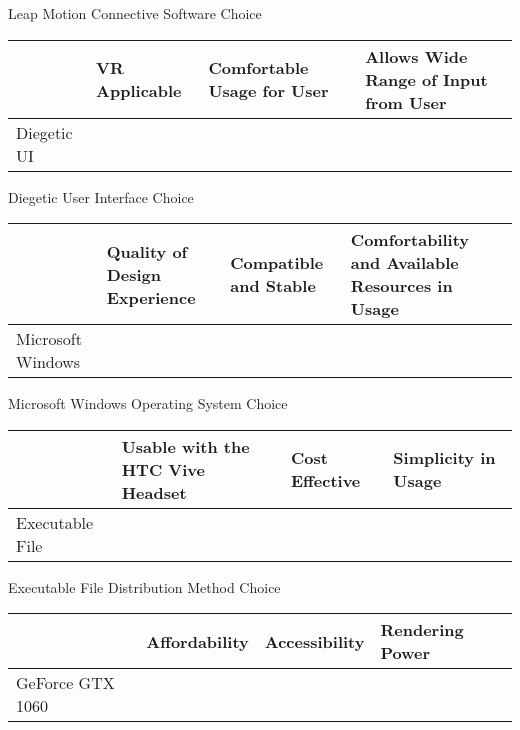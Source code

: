 \documentclass[letterpaper,10pt,onecolumn,compsoc]{IEEEtran}
\begin{document}
\begin{center}
Leap Motion Connective Software Choice
\end{center}

\begin{center}
\begin{tabular}{ | P{2.75cm} | P{2.25cm} | P{4.5cm} | P{6.25cm} | } 
 	\hline
 	 & VR Applicable & Comfortable Usage for User & Allows Wide Range of Input from User \\ 
 	\hline 		
 	Diegetic UI & \checkmark & \checkmark & \checkmark \\ 
 	\hline
\end{tabular}
\end{center}

\begin{center}
Diegetic User Interface Choice
\end{center}

\begin{center}
\begin{tabular}{ | P{3.25cm} | P{4.5cm} | P{3.5cm} | P{4.5cm} | } 
 	\hline
 	 &  Quality of Design Experience & Compatible and Stable & Comfortability and Available Resources in Usage \\ 
 	\hline 		
 	Microsoft Windows &  & \checkmark & \checkmark \\ 
 	\hline
\end{tabular}
\end{center}

\begin{center}
Microsoft Windows Operating System Choice
\end{center}

\begin{center}
\begin{tabular}{ |  P{3.625cm} | P{6cm} | P{2.5cm} | P{3.625cm} | } 
 	\hline
 	 & Usable with the HTC Vive Headset & Cost Effective & Simplicity in Usage \\ 
 	\hline 		
 	Executable File & \checkmark & \checkmark & \checkmark \\ 
 	\hline
\end{tabular}
\end{center}

\begin{center}
Executable File Distribution Method Choice
\end{center}

\begin{center}
\begin{tabular}{ | P{5.625cm} | P{3cm} | P{2.5cm} | P{4.625cm} | } 
 	\hline
 	 & Affordability & Accessibility & Rendering Power \\ 
 	\hline 		
 	GeForce GTX 1060 & \checkmark & \checkmark & \checkmark \\ 
 	\hline
\end{tabular}
\end{center}
\end{document}
